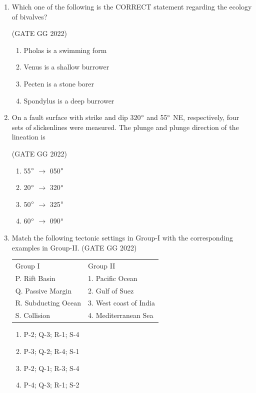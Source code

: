 \documentclass[journal]{IEEEtran}
\begin{document}
\begin{enumerate}[start=1]
\item Which one of the following is the CORRECT statement regarding the ecology of bivalves?  

\hfill(GATE GG 2022)
\begin{enumerate}
\item Pholas is a swimming form  
\item Venus is a shallow burrower  
\item Pecten is a stone borer  
\item Spondylus is a deep burrower  
\end{enumerate}

\item On a fault surface with strike and dip 320$\degree$ and 55$\degree$ NE, respectively, four sets of slickenlines were measured. The plunge and plunge direction of the lineation is  

\hfill(GATE GG 2022)
\begin{enumerate}
\item 55$\degree$ $\to$ 050$\degree$  
\item 20$\degree$ $\to$ 320$\degree$  
\item 50$\degree$ $\to$ 325$\degree$  
\item 60$\degree$ $\to$ 090$\degree$    
\end{enumerate}


\item Match the following tectonic settings in Group-I with the corresponding examples in Group-II. 
\hfill(GATE GG 2022)
\begin{tabular}{ l l}
Group I & Group II \\ 
P. Rift Basin & 1. Pacific Ocean \\
Q. Passive Margin & 2. Gulf of Suez \\
R. Subducting Ocean & 3. West coast of India \\
S. Collision & 4. Mediterranean Sea 
\end{tabular}
\begin{enumerate}
\item P-2; Q-3; R-1; S-4  
\item P-3; Q-2; R-4; S-1  
\item P-2; Q-1; R-3; S-4  
\item P-4; Q-3; R-1; S-2  
\end{enumerate}



\end{enumerate}
\end{document}
